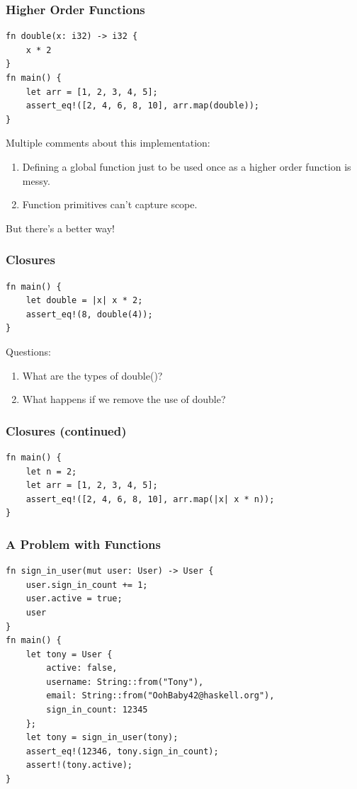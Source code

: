 \documentclass{slides}
\begin{document}
\begin{frame}[fragile]
\frametitle{Higher Order Functions}
\begin{verbatim}
fn double(x: i32) -> i32 {
    x * 2
}
fn main() {
    let arr = [1, 2, 3, 4, 5];
    assert_eq!([2, 4, 6, 8, 10], arr.map(double));
}
\end{verbatim}
Multiple comments about this implementation:
\begin{enumerate}
    \item Defining a global function just to be used once as a higher order function is messy.
    \item Function primitives can't capture scope.
\end{enumerate}
But there's a better way!
\end{frame}

\begin{frame}[fragile]
\frametitle{Closures}
\begin{verbatim}
fn main() {
    let double = |x| x * 2;
    assert_eq!(8, double(4));
}
\end{verbatim}
Questions:
\begin{enumerate}
    \item What are the types of double()?
    \item What happens if we remove the use of double?
\end{enumerate}
\end{frame}

\begin{frame}[fragile]
\frametitle{Closures (continued)}
\begin{verbatim}
fn main() {
    let n = 2;
    let arr = [1, 2, 3, 4, 5];
    assert_eq!([2, 4, 6, 8, 10], arr.map(|x| x * n));
}
\end{verbatim}
\end{frame}

\begin{frame}[fragile]
\frametitle{A Problem with Functions}
\begin{verbatim}
fn sign_in_user(mut user: User) -> User {
    user.sign_in_count += 1;
    user.active = true;
    user
}
fn main() {
    let tony = User {
        active: false,
        username: String::from("Tony"),
        email: String::from("OohBaby42@haskell.org"),
        sign_in_count: 12345
    };
    let tony = sign_in_user(tony);
    assert_eq!(12346, tony.sign_in_count);
    assert!(tony.active);
}
\end{verbatim}
\end{frame}
\end{document}
